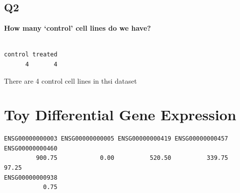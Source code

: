 \documentclass[
  letterpaper,
  DIV=11,
  numbers=noendperiod]{scrartcl}
\newenvironment{Shaded}{\begin{snugshade}}{\end{snugshade}}
\newcommand{\DecValTok}[1]{\textcolor[rgb]{0.68,0.00,0.00}{#1}}
\newcommand{\FunctionTok}[1]{\textcolor[rgb]{0.28,0.35,0.67}{#1}}
\newcommand{\NormalTok}[1]{\textcolor[rgb]{0.00,0.23,0.31}{#1}}
\newcommand{\OtherTok}[1]{\textcolor[rgb]{0.00,0.23,0.31}{#1}}
\newcommand{\SpecialCharTok}[1]{\textcolor[rgb]{0.37,0.37,0.37}{#1}}
\newcommand{\StringTok}[1]{\textcolor[rgb]{0.13,0.47,0.30}{#1}}
\begin{document}
\hypertarget{q2}{%
\subsection{\texorpdfstring{\textbf{Q2}}{Q2}}\label{q2}}

\textbf{How many `control' cell lines do we have?}

\begin{Shaded}
\end{Shaded}

\begin{verbatim}

control treated 
      4       4 
\end{verbatim}

There are 4 control cell lines in thsi dataset

\hypertarget{toy-differential-gene-expression}{%
\section{Toy Differential Gene
Expression}\label{toy-differential-gene-expression}}

\begin{Shaded}
\end{Shaded}

\begin{verbatim}
ENSG00000000003 ENSG00000000005 ENSG00000000419 ENSG00000000457 ENSG00000000460 
         900.75            0.00          520.50          339.75           97.25 
ENSG00000000938 
           0.75 
\end{verbatim}

\begin{Shaded}
\end{Shaded}
\end{document}
